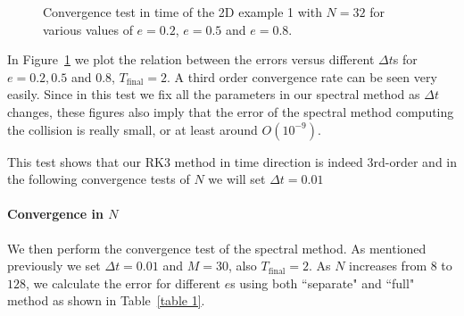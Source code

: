 \documentclass[review, times]{elsarticle}
\begin{document}
\begin{figure}[H]
  \caption{Convergence test in time of the 2D example 1 with $N = 32$ for various values of $e=0.2$, $e=0.5$ and $e=0.8$.}
  \label{dt_conv_1}
\end{figure}

In Figure~\ref{dt_conv_1} we plot the relation between the errors versus different $\Delta t$s for $e = 0.2, 0.5$ and $0.8$, $T_\text{final}=2$. A third order convergence rate can be seen very easily. Since in this test we fix all the parameters in our spectral method as $\Delta t$ changes, these figures also imply that the error of the spectral method computing the collision is really small, or at least around $O(10^{-9})$.

This test shows that our RK3 method in time direction is indeed 3rd-order and in the following convergence tests of $N$ we will set $\Delta t = 0.01$

\paragraph{\bf Convergence in $N$} We then perform the convergence test of the spectral method. As mentioned previously we set $\Delta t = 0.01$ and $M = 30$, also $T_\text{final} = 2$. As $N$ increases from $8$ to $128$, we calculate the error for different $e$s using both ``separate" and ``full" method as shown in Table~\ref{table 1}.
\end{document}
